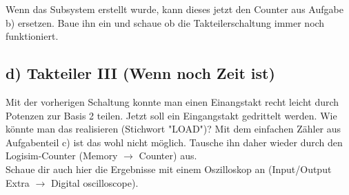 \documentclass[a4paper]{scrartcl}
\begin{document}
Wenn das Subsystem erstellt wurde, kann dieses jetzt den Counter aus Aufgabe b) ersetzen. Baue ihn ein und schaue ob die Takteilerschaltung immer noch funktioniert.
\newpage

\subsection*{d) Takteiler III (Wenn noch Zeit ist)}
Mit der vorherigen Schaltung konnte man einen Einangstakt recht leicht durch Potenzen zur Basis 2 teilen. 
Jetzt soll ein Eingangstakt gedrittelt werden. Wie könnte man das realisieren (Stichwort "LOAD")? Mit dem einfachen Zähler aus Aufgabenteil c) ist das wohl nicht möglich. Tausche ihn daher wieder durch den Logisim-Counter (Memory $\rightarrow$ Counter) aus.\\
Schaue dir auch hier die Ergebnisse mit einem Oszilloskop an (Input/Output Extra $\rightarrow$ Digital oscilloscope).
\end{document}
